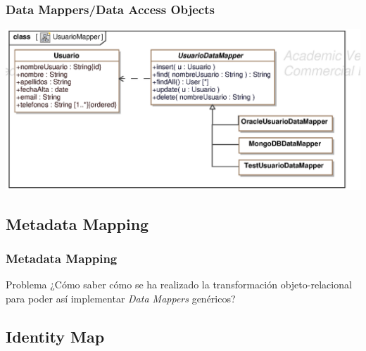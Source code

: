 \documentclass[a4paper,slidestop,xcolor=pst,blue]{beamer}
\begin{document}
\begin{frame}[c]
    \frametitle{Data Mappers/Data Access Objects}
    \begin{center}
        \includegraphics[width=0.8\linewidth]{images/behaviour/dataMapper.eps}
    \end{center}
\end{frame}

\subsection{Metadata Mapping}

\begin{frame}[c]
    \frametitle{Metadata Mapping}
    \begin{block}{Problema}
        ¿Cómo saber cómo se ha realizado la transformación objeto-relacional para poder así implementar \emph{Data Mappers} genéricos?
    \end{block}
\end{frame}

\subsection{Identity Map}
\end{document}
